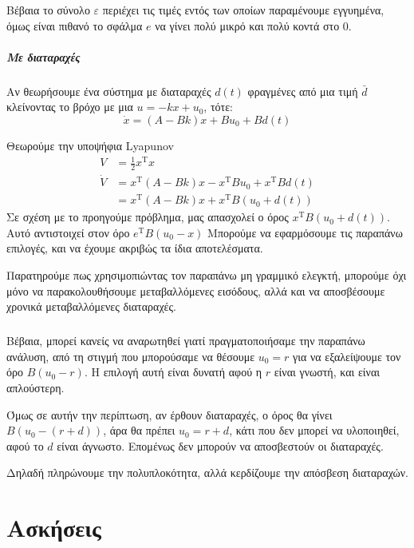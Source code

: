 \documentclass[11pt,a4paper,notitlepage,fleqn]{article}
\begin{document}
Βέβαια το σύνολο \( \varepsilon \) περιέχει τις τιμές εντός των οποίων παραμένουμε εγγυημένα, όμως είναι πιθανό το σφάλμα \( e \) να γίνει πολύ μικρό και πολύ κοντά στο 0.

\subparagraph{Με διαταραχές}
Αν θεωρήσουμε ένα σύστημα με διαταραχές \( d(t) \) φραγμένες από μια τιμή \( \bar d \) κλείνοντας το βρόχο με μια \( u = -kx + u_0  \), τότε:
\[
\dot x = (A-Bk) x + Bu_0 + Bd(t)
\]

Θεωρούμε την υποψήφια Lyapunov
\begin{align*}
	V &= \frac{1}{2} x^{\mathrm T} x
	\\
	\dot{V} &= x^{\mathrm T} (A-Bk) x - x^{\mathrm T} B u_0
	+ x^{\mathrm T} B d(t)
	\\ &= x^{\mathrm T}(A-Bk)x + x^{\mathrm T} B (u_0 + d(t))
\end{align*}
Σε σχέση με το προηγούμε πρόβλημα, μας απασχολεί ο όρος \( x^{\mathrm T}B\left(u_0 + d(t)\right) \).
Αυτό αντιστοιχεί στον όρο \( e^{\mathrm T}B(u_0 - x) \)
Μπορούμε να εφαρμόσουμε τις παραπάνω επιλογές, και να έχουμε ακριβώς τα ίδια αποτελέσματα.

Παρατηρούμε πως χρησιμοπιώντας τον παραπάνω μη γραμμικό ελεγκτή, μπορούμε όχι μόνο να παρακολουθήσουμε μεταβαλλόμενες εισόδους, αλλά και να αποσβέσουμε χρονικά μεταβαλλόμενες διαταραχές.

\subparagraph{}
Βέβαια, μπορεί κανείς να αναρωτηθεί γιατί πραγματοποιήσαμε την παραπάνω ανάλυση, από τη στιγμή που μπορούσαμε να θέσουμε \( u_0 = r \) για να εξαλείψουμε τον όρο \( B(u_0 - r) \). Η επιλογή αυτή είναι δυνατή αφού η
\( r \) είναι γνωστή, και είναι απλούστερη.

Όμως σε αυτήν την περίπτωση, αν έρθουν διαταραχές, ο όρος θα γίνει
\( B\left(u_0 - (r+d)\right) \), άρα θα πρέπει \( u_0 = r + d \), κάτι
που δεν μπορεί να υλοποιηθεί, αφού το \( d \) είναι άγνωστο. Επομένως δεν
μπορούν να αποσβεστούν οι διαταραχές.

Δηλαδή πληρώνουμε την πολυπλοκότητα, αλλά κερδίζουμε την απόσβεση διαταραχών.


\section{Ασκήσεις}
\end{document}
